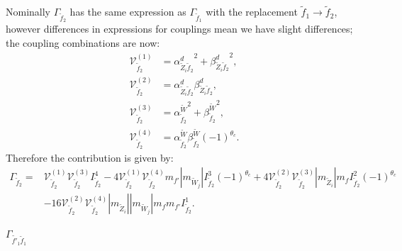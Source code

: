 \documentclass[final,3p,times]{elsarticle}
\begin{document}
Nominally $\Gamma_{\tilde{f}_2}$ has the same expression as $\Gamma_{\tilde{f}_1}$ with the replacement $\tilde{f}_1 \rightarrow
\tilde{f}_2$, however differences in expressions for couplings mean we have
slight differences; 
the coupling combinations are now:
\begin{align}
\mathcal{V}_{\tilde{f}_2}^{(1)} &= {\alpha_{\tilde{Z}_i \tilde{f}_2}^{d}}^2 + {\beta_{\tilde{Z}_i \tilde{f}_2}^{d}}^2, \\
\mathcal{V}_{\tilde{f}_2}^{(2)} &= {\alpha_{\tilde{Z}_i \tilde{f}_2}^{d}} {\beta_{\tilde{Z}_i \tilde{f}_2}^{d}}, \\
\mathcal{V}_{\tilde{f}_2}^{(3)} &= {\alpha_{\tilde{f}_2}^{\tilde{W}}}^2 + {\beta_{\tilde{f}_2}^{\tilde{W}}}^2, \\
\mathcal{V}_{\tilde{f}_2}^{(4)} &= \alpha_{\tilde{f}_2}^{\tilde{W}} \beta_{\tilde{f}_2}^{\tilde{W}}(-1)^{\theta_c}.
\end{align}
Therefore the contribution is given by:
\begin{equation}
\begin{aligned}
\Gamma_{\tilde{f}_2} = & \mathcal{V}_{\tilde{f}_2}^{(1)} \mathcal{V}_{\tilde{f}_2}^{(3)} I_{\tilde{f}_2}^{4} - 4 \mathcal{V}_{\tilde{f}_2}^{(1)} \mathcal{V}_{\tilde{f}_2}^{(4)} m_{f'} |m_{\tilde{W}_j}| I_{\tilde{f}_2}^{3} (-1)^{\theta_c}+ 4 \mathcal{V}_{\tilde{f}_2}^{(2)} \mathcal{V}_{\tilde{f}_2}^{(3)} |m_{\tilde{Z}_i}|m_{f} I_{\tilde{f}_2}^{2}(-1)^{\theta_c} \\ & - 16 \mathcal{V}_{\tilde{f}_2}^{(2)}  \mathcal{V}_{\tilde{f}_2}^{(4)} |m_{\tilde{Z}_i}||m_{\tilde{W}_j}|m_{f}m_{f'}I_{\tilde{f}_2}^{1}.
\end{aligned}
\end{equation}

\textbf{\underline{$\Gamma_{\tilde{f'}_1 \tilde{f}_1}$}}
\end{document}
